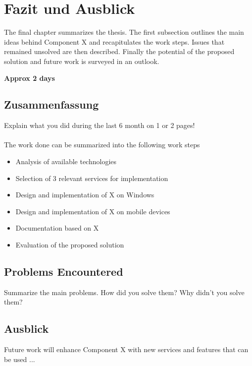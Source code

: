 \chapter{Fazit und Ausblick\label{cha:chapter7}}
The final chapter summarizes the thesis. The first subsection outlines the main ideas behind Component X and recapitulates the work steps. Issues that remained unsolved are then described. Finally the potential of the proposed solution and future work is surveyed in an outlook.

\textbf{Approx 2 days}
\section{Zusammenfassung\label{sec:summary}}

Explain what you did during the last 6 month on 1 or 2 pages!
\\
\\
\noindent The work done can be summarized into the following work steps

\begin{itemize}
		\item Analysis of available technologies
		\vspace{-0.11in} 
		\item Selection of 3 relevant services for implementation
		\vspace{-0.11in} 
		\item Design and implementation of X on Windows
		\vspace{-0.11in} 
		\item Design and implementation of X on mobile devices
		\vspace{-0.11in} 
		\item Documentation based on X
		\vspace{-0.11in} 
		\item Evaluation of the proposed solution
\end{itemize}

\section{Problems Encountered\label{sec:problems}}

Summarize the main problems. How did you solve them? Why didn't you solve them?

\section{Ausblick\label{sec:outlook}}

Future work will enhance Component X with new services and features that can be used ...